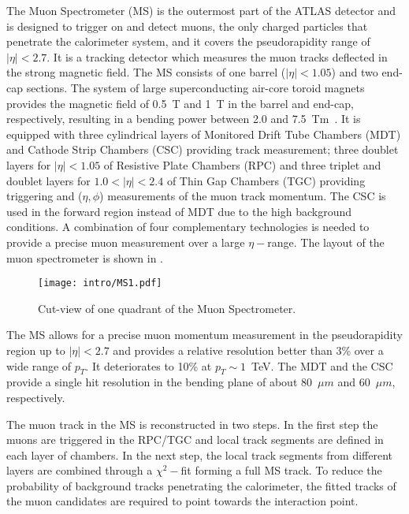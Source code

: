 The Muon Spectrometer (MS) is the outermost part of the ATLAS detector and is designed to trigger on and detect muons, the only charged particles that penetrate the calorimeter system, and it covers the pseudorapidity range of $|\eta|<2.7$. It is a tracking detector which measures the muon tracks deflected in the strong magnetic field. The MS consists of one barrel ($|\eta|<1.05$) and two end-cap sections. The system of large superconducting air-core toroid magnets provides the magnetic field of 0.5~T and 1~T in the barrel and end-cap, respectively, resulting in a bending power between 2.0 and 7.5~Tm~\cite{MCPrun1}. It is equipped with three cylindrical layers of Monitored Drift Tube Chambers (MDT) and Cathode Strip Chambers (CSC) providing track measurement; three doublet layers for $|\eta|<1.05$ of Resistive Plate Chambers (RPC) and three triplet and doublet layers for $1.0 < |\eta| < 2.4$ of Thin Gap Chambers (TGC) providing triggering and ($\eta, \phi$) measurements of the muon track momentum.
The CSC is used in the forward region instead of MDT due to the high background conditions.
A combination of four complementary technologies is needed to provide a precise muon measurement over a large $\eta-$range. The layout of the muon spectrometer is shown in .

\begin{figure}[h!]
\centering
 \texttt{[image: intro/MS1.pdf]}
 \caption{Cut-view of one quadrant of the Muon Spectrometer.}
\label{fig:MS}
\end{figure}

The MS allows for a precise muon momentum measurement in the pseudorapidity region up to 
$|\eta|<2.7$ and provides a relative resolution better than 3\% over a wide range of $p_T$. It deteriorates to 10\% at $p_T\sim 1$~TeV.
The MDT and the CSC provide a single hit resolution in the bending plane of about 80~$\mu m$ and 60~$\mu m$, respectively.

The muon track in the MS is reconstructed in two steps. In the first step the muons are triggered in the RPC/TGC and local track segments are defined in each layer of chambers. In the next step, the local track segments from different layers are combined through a $\chi^2-$fit forming a full MS track. To reduce the probability of background tracks penetrating the calorimeter, the fitted tracks of the muon candidates are required to point towards the interaction point.

